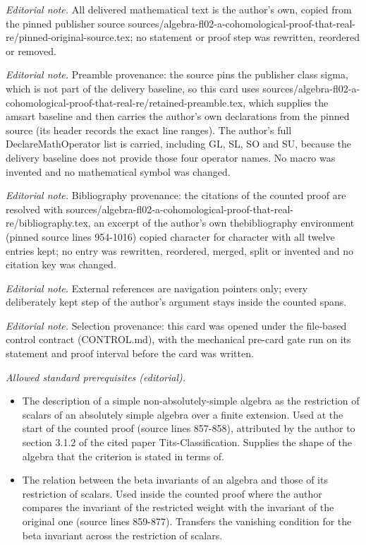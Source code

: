 \maketitle
\noindent\textit{Editorial note.} All delivered mathematical text is the author's own, copied from the pinned publisher source sources/algebra-fl02-a-cohomological-proof-that-real-re/pinned-original-source.tex; no statement or proof step was rewritten, reordered or removed.\par\medskip
\noindent\textit{Editorial note.} Preamble provenance: the source pins the publisher class sigma, which is not part of the delivery baseline, so this card uses sources/algebra-fl02-a-cohomological-proof-that-real-re/retained-preamble.tex, which supplies the amsart baseline and then carries the author's own declarations from the pinned source (its header records the exact line ranges). The author's full DeclareMathOperator list is carried, including GL, SL, SO and SU, because the delivery baseline does not provide those four operator names. No macro was invented and no mathematical symbol was changed.\par\medskip
\noindent\textit{Editorial note.} Bibliography provenance: the citations of the counted proof are resolved with sources/algebra-fl02-a-cohomological-proof-that-real-re/bibliography.tex, an excerpt of the author's own thebibliography environment (pinned source lines 954-1016) copied character for character with all twelve entries kept; no entry was rewritten, reordered, merged, split or invented and no citation key was changed.\par\medskip
\noindent\textit{Editorial note.} External references are navigation pointers only; every deliberately kept step of the author's argument stays inside the counted spans.\par\medskip
\noindent\textit{Editorial note.} Selection provenance: this card was opened under the file-based control contract (CONTROL.md), with the mechanical pre-card gate run on its statement and proof interval before the card was written.\par\medskip
\noindent\textit{Allowed standard prerequisites (editorial).}\begin{itemize}
\item The description of a simple non-absolutely-simple algebra as the restriction of scalars of an absolutely simple algebra over a finite extension. Used at the start of the counted proof (source lines 857-858), attributed by the author to section 3.1.2 of the cited paper Tits-Classification. Supplies the shape of the algebra that the criterion is stated in terms of.
\item The relation between the beta invariants of an algebra and those of its restriction of scalars. Used inside the counted proof where the author compares the invariant of the restricted weight with the invariant of the original one (source lines 859-877). Transfers the vanishing condition for the beta invariant across the restriction of scalars.
\end{itemize}\medskip
